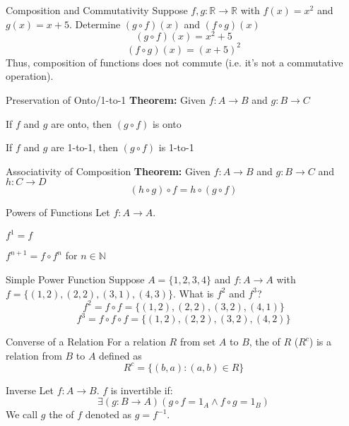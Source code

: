 \documentclass[12pt]{report}
\begin{document}
\begin{exbox}{Composition and Commutativity}
	Suppose $f,g : \mathbb{R} \rightarrow \mathbb{R}$ with $f(x) = x^2$ and $g(x) = x+5$. Determine $(g \circ f)(x)$ and $(f \circ g)(x)$
	\tcblower
	$$(g \circ f)(x) = x^2 + 5$$
	$$(f \circ g)(x) = (x+5)^2$$
	Thus, composition of functions does not commute (i.e. it's not a commutative operation).
\end{exbox}

\begin{thmbox}{Preservation of Onto/1-to-1}
	\textbf{Theorem:} Given $f: A \rightarrow B$ and $g : B \rightarrow C$
	\begin{dfnitems}
		\item If $f$ and $g$ are onto, then $(g \circ f)$ is onto
		\item If $f$ and $g$ are 1-to-1, then $(g \circ f)$ is 1-to-1
	\end{dfnitems}
\end{thmbox}

\begin{thmbox}{Associativity of Composition}
	\textbf{Theorem:} Given $f : A \rightarrow B$ and $g : B \rightarrow C$ and $h : C \rightarrow D$
	$$(h \circ g) \circ f = h \circ (g \circ f)$$
\end{thmbox}

\begin{dfnbox}{Powers of Functions}
	Let $f : A \rightarrow A$.
	\begin{dfnitems}
		\item $f^1 = f$
		\item $f^{n+1} = f \circ f^n$ for $n \in \mathbb{N}$
	\end{dfnitems}
\end{dfnbox}

\begin{exbox}{Simple Power Function}
	Suppose $A = \{1,2,3,4\}$ and $f : A \rightarrow A$ with $f = \{(1,2), (2,2), (3,1), (4,3) \}$. What is $f^2$ and $f^3$?
	\tcblower
	$$f^2 = f \circ f = \{ (1,2), (2,2), (3,2), (4,1) \}$$
	$$ f^3 = f \circ f \circ f = \{(1,2), (2,2), (3,2), (4,2) \}$$
\end{exbox}

\begin{dfnbox}{Converse of a Relation}
	For a relation $R$ from set $A$ to $B$, the  of $R$ ($R^c$) is a relation from $B$ to $A$ defined as
	$$R^c = \{(b,a) : (a,b) \in R\}$$
\end{dfnbox}

\begin{dfnbox}{Inverse}
	Let $f : A \rightarrow B$. $f$ is invertible if: $$\exists (g : B \rightarrow A)(g \circ f = 1_A \land f \circ g = 1_B)$$ We call $g$ the  of $f$ denoted as $g = f^{-1}$.
\end{dfnbox}
\end{document}
